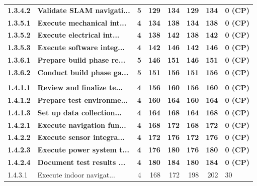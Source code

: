 \begin{longtable}{@{}llrrrrrl@{}}
\textbf{1.3.4.2} & \textbf{Validate SLAM navigati...} & \textbf{5} & \textbf{129} & \textbf{134} & \textbf{129} & \textbf{134} & \textbf{0 (CP)} \\
\textbf{1.3.5.1} & \textbf{Execute mechanical int...} & \textbf{4} & \textbf{134} & \textbf{138} & \textbf{134} & \textbf{138} & \textbf{0 (CP)} \\
\textbf{1.3.5.2} & \textbf{Execute electrical int...} & \textbf{4} & \textbf{138} & \textbf{142} & \textbf{138} & \textbf{142} & \textbf{0 (CP)} \\
\textbf{1.3.5.3} & \textbf{Execute software integ...} & \textbf{4} & \textbf{142} & \textbf{146} & \textbf{142} & \textbf{146} & \textbf{0 (CP)} \\
\textbf{1.3.6.1} & \textbf{Prepare build phase re...} & \textbf{5} & \textbf{146} & \textbf{151} & \textbf{146} & \textbf{151} & \textbf{0 (CP)} \\
\textbf{1.3.6.2} & \textbf{Conduct build phase ga...} & \textbf{5} & \textbf{151} & \textbf{156} & \textbf{151} & \textbf{156} & \textbf{0 (CP)} \\
\addlinespace
\multicolumn{8}{l}{\textbf{Test Phase}} \\
\addlinespace
\textbf{1.4.1.1} & \textbf{Review and finalize te...} & \textbf{4} & \textbf{156} & \textbf{160} & \textbf{156} & \textbf{160} & \textbf{0 (CP)} \\
\textbf{1.4.1.2} & \textbf{Prepare test environme...} & \textbf{4} & \textbf{160} & \textbf{164} & \textbf{160} & \textbf{164} & \textbf{0 (CP)} \\
\textbf{1.4.1.3} & \textbf{Set up data collection...} & \textbf{4} & \textbf{164} & \textbf{168} & \textbf{164} & \textbf{168} & \textbf{0 (CP)} \\
\textbf{1.4.2.1} & \textbf{Execute navigation fun...} & \textbf{4} & \textbf{168} & \textbf{172} & \textbf{168} & \textbf{172} & \textbf{0 (CP)} \\
\textbf{1.4.2.2} & \textbf{Execute sensor integra...} & \textbf{4} & \textbf{172} & \textbf{176} & \textbf{172} & \textbf{176} & \textbf{0 (CP)} \\
\textbf{1.4.2.3} & \textbf{Execute power system t...} & \textbf{4} & \textbf{176} & \textbf{180} & \textbf{176} & \textbf{180} & \textbf{0 (CP)} \\
\textbf{1.4.2.4} & \textbf{Document test results ...} & \textbf{4} & \textbf{180} & \textbf{184} & \textbf{180} & \textbf{184} & \textbf{0 (CP)} \\
1.4.3.1 & Execute indoor navigat... & 4 & 168 & 172 & 198 & 202 & 30 \\

\end{longtable}
